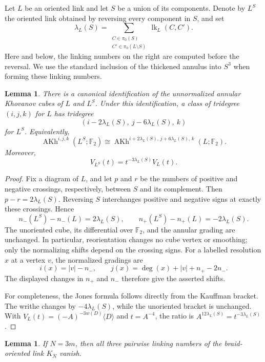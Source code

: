 \documentclass[11pt]{amsart}
\newtheorem{lemma}[theorem]{Lemma}
\theoremstyle{remark}
\newcommand{\F}{\mathbb F_2}
\newcommand{\AKh}{\operatorname{AKh}}
\begin{document}
Let \(L\) be an oriented link and let \(S\) be a union of its components.  Denote by
\(L^S\) the oriented link obtained by reversing every component in \(S\), and set
\[
  \lambda_L(S)
  =\sum_{\substack{C\in\pi_0(S)\\ C'\in\pi_0(L\setminus S)}}
     \operatorname{lk}_L(C,C').
\]
Here and below, the linking numbers on the right are computed before the reversal.
We use the standard inclusion of the thickened annulus into \(S^3\) when forming
these linking numbers.

\begin{lemma}\label{lem:reorientation}
There is a canonical identification of the unnormalized annular Khovanov cubes of
\(L\) and \(L^S\).  Under this identification, a class of tridegree \((i,j,k)\) for
\(L\) has tridegree
\[
  (i-2\lambda_L(S),\ j-6\lambda_L(S),\ k)
\]
for \(L^S\).  Equivalently,
\[
  \AKh^{i,j,k}(L^S;\F)
  \cong
  \AKh^{i+2\lambda_L(S),\,j+6\lambda_L(S),\,k}(L;\F).
\]
Moreover,
\begin{equation}\label{eq:jones-reorientation}
  V_{L^S}(t)=t^{-3\lambda_L(S)}V_L(t).
\end{equation}
\end{lemma}

\begin{proof}
Fix a diagram of \(L\), and let \(p\) and \(r\) be the numbers of positive and
negative crossings, respectively, between \(S\) and its complement.  Then
\(p-r=2\lambda_L(S)\).  Reversing \(S\) interchanges positive and negative signs at
exactly these crossings.  Hence
\[
 n_-(L^S)-n_-(L)=2\lambda_L(S),
 \qquad
 n_+(L^S)-n_+(L)=-2\lambda_L(S).
\]
The unoriented cube, its differential over \(\F\), and the annular grading are
unchanged.  In particular, reorientation changes no cube vertex or smoothing; only
the normalizing shifts depend on the crossing signs.  For a labelled resolution \(x\)
at a vertex \(v\), the normalized
gradings are
\[
 i(x)=|v|-n_-,
 \qquad
 j(x)=\deg(x)+|v|+n_+-2n_-.
\]
The displayed changes in \(n_+\) and \(n_-\) therefore give the asserted shifts.

For completeness, the Jones formula follows directly from the Kauffman bracket.
The writhe changes by \(-4\lambda_L(S)\), while the unoriented bracket is unchanged.
With \(V_L(t)=(-A)^{-3w(D)}\langle D\rangle\) and \(t=A^{-4}\), the ratio is
\(A^{12\lambda_L(S)}=t^{-3\lambda_L(S)}\).
\end{proof}

\begin{lemma}\label{lem:target-linking}
If \(N=3m\), then all three pairwise linking numbers of the braid-oriented link
\(K_N\) vanish.
\end{lemma}
\end{document}
